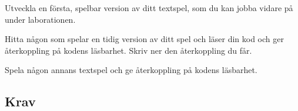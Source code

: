 
\Lab{\LabWeekTHREE}
\begin{Goals}

\end{Goals}

\begin{Preparations}
\item {}
\item {}
\item Utveckla en första, spelbar version av ditt textspel, som du kan jobba vidare på under laborationen.
\item Hitta någon som spelar en tidig version av ditt spel och läser din kod och ger återkoppling på kodens läsbarhet. Skriv ner den återkoppling du får.
\item Spela någon annans textspel och ge återkoppling på kodens läsbarhet.
\end{Preparations}


\subsection{Krav}

